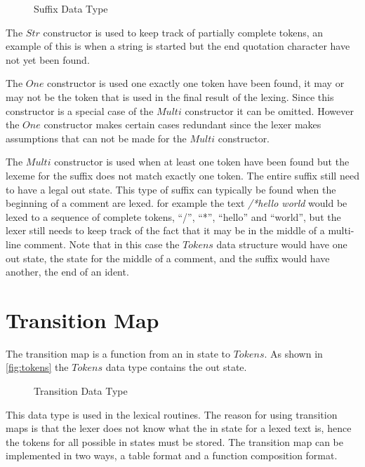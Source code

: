 \begin{figure}[h!]
  
  \caption{Suffix Data Type\label{fig:suff}}
\end{figure}

The $Str$ constructor is used to keep track of partially complete tokens, an
example of this is when a string is started but the end quotation character have
not yet been found.

The $One$ constructor is used one exactly one token have been found, it may or
may not be the token that is used in the final result of the lexing. Since this
constructor is a special case of the $Multi$ constructor it can be omitted.
However the $One$ constructor makes certain cases redundant since the lexer
makes assumptions that can not be made for the $Multi$ constructor.

The $Multi$ constructor is used when at least one token have been found but the
lexeme for the suffix does not match exactly one token. The entire suffix still
need to have a legal out state. This type of suffix can typically be found when
the beginning of a comment are lexed. for example the text \emph{/*hello world}
would be lexed to a sequence of complete tokens, ``/'', ``*'', ``hello'' and
``world'', but the lexer still needs to keep track of the fact that it may be in
the middle of a multi-line comment. Note that in this case the $Tokens$ data
structure would have one out state, the state for the middle of a comment, and
the suffix would have another, the end of an ident.

\section{Transition Map}
The transition map is a function from an in state to $Tokens$. As shown in
\cref{fig:tokens} the $Tokens$ data type contains the out state.

\begin{figure}[h!]
  
  \caption{Transition Data Type \label{fig:transition}}
\end{figure}

This data type is used in the lexical routines. The reason for using transition
maps is that the lexer does not know what the in state for a lexed text is, hence
the tokens for all possible in states must be stored. The transition map can be
implemented in two ways, a table format and a function composition format.

